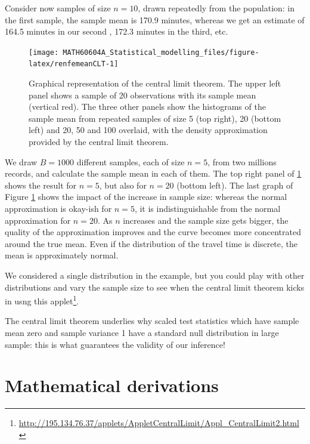 \documentclass[
  11pt,
  letterpaper,
]{book}
\renewcommand{\href}[2]{#2\footnote{\url{#1}}}
\theoremstyle{definition}
\theoremstyle{definition}
\theoremstyle{definition}
\theoremstyle{remark}
\begin{document}
Consider now samples of size \(n=10\), drawn repeatedly from the population: in the first sample, the sample mean is 170.9 minutes, whereas we get an estimate of 164.5 minutes in our second , 172.3 minutes in the third, etc.

\begin{figure}

{\centering \texttt{[image: MATH60604A\_Statistical\_modelling\_files/figure-latex/renfemeanCLT-1]} 

}

\caption{Graphical representation of the central limit theorem. The upper left panel shows a sample of 20 observations with its sample mean (vertical red). The three other panels show the histograms of the sample mean from repeated samples of size 5 (top right), 20 (bottom left) and 20, 50 and 100 overlaid, with the density approximation provided by the central limit theorem.}\label{fig:renfemeanCLT}
\end{figure}

We draw \(B=1000\) different samples, each of size \(n=5\), from two millions records, and calculate the sample mean in each of them. The top right panel of \ref{fig:renfemeanCLT} shows the result for \(n=5\), but also for \(n=20\) (bottom left). The last graph of Figure \ref{fig:renfemeanCLT} shows the impact of the increase in sample size: whereas the normal approximation is okay-ish for \(n=5\), it is indistinguishable from the normal approximation for \(n=20\). As \(n\) increases and the sample size gets bigger, the quality of the approximation improves and the curve becomes more concentrated around the true mean. Even if the distribution of the travel time is discrete, the mean is approximately normal.

We considered a single distribution in the example, but you could play with other distributions and vary the sample size to see when the central limit theorem kicks in usng this \href{http://195.134.76.37/applets/AppletCentralLimit/Appl_CentralLimit2.html}{applet}.

The central limit theorem underlies why scaled test statistics which have sample mean zero and sample variance 1 have a standard null distribution in large sample: this is what guarantees the validity of our inference!

\hypertarget{math}{%
\chapter{Mathematical derivations}\label{math}}
\end{document}
